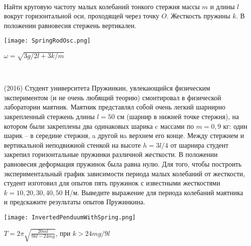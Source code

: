 \begin{ex}
\hspace{0pt} \\
\begin{minipage}{.65\textwidth} 
Найти круговую частоту малых колебаний тонкого стержня массы $m$ и длины $l$ вокруг горизонтальной оси, проходящей через точку $O$. 
Жесткость пружины $k$. В положении равновесия стержень вертикален.
\end{minipage}
\begin{minipage}{.35\textwidth}
\centering
\texttt{[image: SpringRodOsc.png]}
\end{minipage}
\begin{ans}
$\omega = \sqrt{3g/2l+3k/m}$
\end{ans}
\end{ex}

\begin{ex}
\hspace{0pt} \\
\begin{minipage}{.65\textwidth}
(2016) Студент университета Пружинкин, увлекающийся физическим экспериментом (и не очень любящий теорию) смонтировал в физической лаборатории маятник. Маятник представлял собой очень легкий шарнирно закрепленный стержень длины $l = 50$ см (шарнир в нижней точке стержня), на котором были закреплены два одинаковых шарика c массами по $m = 0,9$ кг: один шарик -- в середине стержня, a другой нa верхнем его конце. Между стержнем и вертикальной неподвижной стенкой на высоте $h=3l/4$ от шарнира студент закрепил горизонтальные пружинки различной жесткости. В положении равновесия деформация пружинок была равна нулю. Для того, чтобы построить экспериментальный график зависимости периода малых колебаний от жесткости, студент изготовил для опытов пять пружинок с известными жесткостями $k = 10, 20, 30, 40, 50$ Н/м. Выведите выражение для периода колебаний маятника и предскажите результаты опытов Пружинкина.
\end{minipage}
\begin{minipage}{.35\textwidth}
\centering
\texttt{[image: InvertedPenduumWithSpring.png]}
\end{minipage}
\begin{ans}
$T=2\pi \sqrt{\frac{20ml}{9kl-24mg}}$, при $k>24mg/9l$
\end{ans}
\end{ex}

